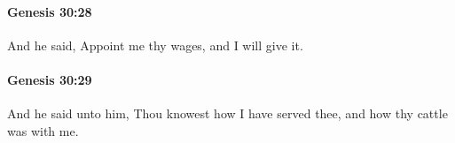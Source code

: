 		\paragraph{Genesis 30:28} %
			\label{GENESIS-30-28}

			And he said, Appoint me thy wages, and I will give it.


		\paragraph{Genesis 30:29} %
			\label{GENESIS-30-29}

			And he said unto him, Thou knowest how I have served thee, and how thy cattle was with me.


